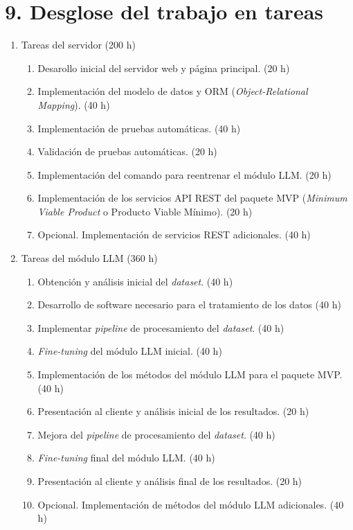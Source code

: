 \documentclass[
11pt, %
]{Clases/charter}
\begin{document}
\section{9. Desglose del trabajo en tareas}
\label{sec:wbs}
\begin{enumerate}
	\item Tareas del servidor (200 h)
	      \begin{enumerate}
		      \item Desarollo inicial del servidor web y página principal. (20 h)
		      \item Implementación del modelo de datos y ORM (\textit{Object-Relational Mapping}). (40 h)
		      \item Implementación de pruebas automáticas. (40 h)
		      \item Validación de pruebas automáticas. (20 h)
		      \item Implementación del comando para reentrenar el módulo LLM. (20 h)
		      \item Implementación de los servicios API REST del paquete MVP (\textit{Minimum Viable Product} o Producto Viable Mínimo). (20 h)
		      \item Opcional. Implementación de servicios REST adicionales. (40 h)
	      \end{enumerate}
	\item Tareas del módulo LLM (360 h)
	      \begin{enumerate}
		      \item Obtención y análisis inicial del \textit{dataset}. (40 h)
		      \item Desarrollo de software necesario para el tratamiento de los datos (40 h)
		      \item Implementar \textit{pipeline} de procesamiento del \textit{dataset}. (40 h)
		      \item \textit{Fine-tuning} del módulo LLM inicial. (40 h)
		      \item Implementación de los métodos del módulo LLM para el paquete MVP. (40 h)
		      \item Presentación al cliente y análisis inicial de los resultados. (20 h)
		      \item Mejora del \textit{pipeline} de procesamiento del \textit{dataset}. (40 h)
		      \item \textit{Fine-tuning} final del módulo LLM. (40 h)
		      \item Presentación al cliente y análisis final de los resultados. (20 h)
		      \item Opcional. Implementación de métodos del módulo LLM adicionales. (40 h)

\end{enumerate}
\end{enumerate}
\end{document}
